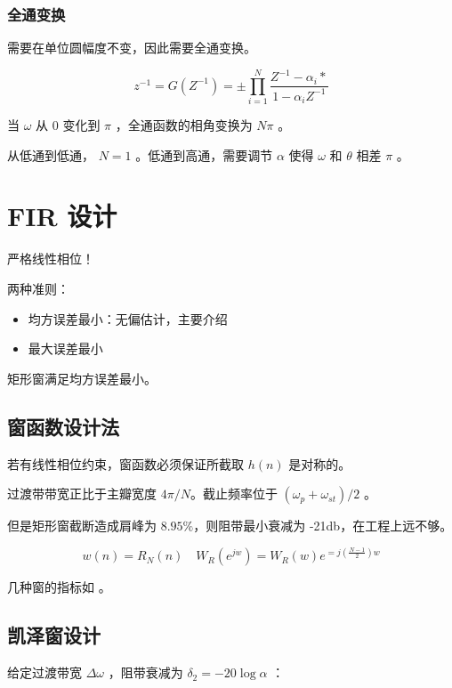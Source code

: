 \documentclass[cn,11pt,chinese,black,simple]{elegantbook}
\begin{document}
\subsubsection{全通变换}

需要在单位圆幅度不变，因此需要全通变换。

\[
z^{-1}=G\left(Z^{-1}\right)=\pm \prod_{i=1}^{N} \frac{Z^{-1}-\alpha_{i} *}{1-\alpha_{i} Z^{-1}}
\]

当 \(\omega\) 从 \(0\) 变化到 \(\pi\) ，全通函数的相角变换为 \(N\pi\) 。

从低通到低通， \(N = 1\) 。低通到高通，需要调节 \(\alpha\) 使得 \(\omega\) 和 \(\theta\) 相差 \(\pi\) 。

\section{FIR 设计}



严格线性相位！

两种准则：

\begin{itemize}
    \item 均方误差最小：无偏估计，主要介绍
    \item 最大误差最小
\end{itemize}

矩形窗满足均方误差最小。

\subsection{窗函数设计法}

若有线性相位约束，窗函数必须保证所截取 \(h(n)\) 是对称的。

过渡带带宽正比于主瓣宽度 \(4 \pi / N\)。截止频率位于 \((\omega_p + \omega_{st}) / 2\) 。

但是矩形窗截断造成肩峰为 \(8.95 \%\)，则阻带最小衰减为 -21db，在工程上远不够。

\[
w(n)=R_{N}(n) \quad W_{R}\left(e^{j w}\right)=W_{R}(w) e^{=j\left(\frac{N-1}{2}\right) w}
\]

几种窗的指标如 。


\subsection{凯泽窗设计}

给定过渡带宽 \(\Delta \omega\) ，阻带衰减为 \(\delta_2 = -20 \log \alpha\) ：
\end{document}
